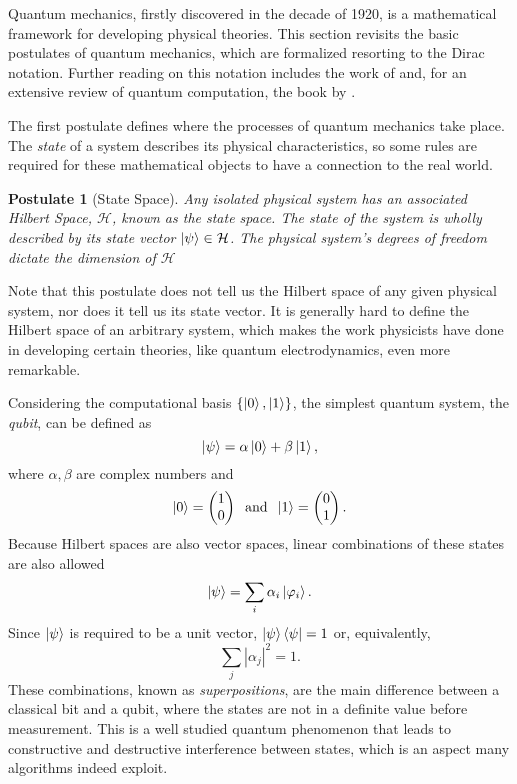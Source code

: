 \documentclass[../../../dissertation.tex]{subfiles}
\newtheorem{post}{Postulate}
\begin{document}
Quantum mechanics, firstly discovered in the decade of 1920, is a mathematical
framework for developing physical theories. This section revisits the basic postulates of quantum mechanics, which are formalized resorting to the
Dirac notation. Further reading on this notation includes the work of
\cite{sakurai1994} and, for an extensive review of quantum computation, the
book by \cite{nielsen2011}.\par  
The first postulate defines where the processes of quantum mechanics take
place. The \textit{state} of a system describes its physical characteristics,
so some rules are required for these mathematical objects to have a connection
to the real world.
\begin{post}[State Space] 
	Any isolated physical system has an associated Hilbert Space,
	$\mathcal{H}$, known as the state space. The state of the system is
	wholly described by its state vector $\ket{\psi} \in \mathcal{H}$. The
	physical system's degrees of freedom dictate the dimension of
	$\mathcal{H}$\par
\end{post}
Note that this postulate does not tell us the Hilbert space of any given
physical system, nor does it tell us its state vector. It is generally hard to
define the Hilbert space of an arbitrary system, which makes the work physicists
have done in developing certain theories, like quantum electrodynamics, even more
remarkable.\par 
Considering the computational basis $\{\ket{0},\ket{1}\}$, the simplest quantum
system, the \textit{qubit}, can be defined as 
\begin{equation}
	\ket{\psi} = \alpha \ket{0} + \beta \ket{1},
\end{equation}
where $\alpha,\beta$ are complex numbers and
\begin{equation}
	\ket{0} = \begin{pmatrix} 1 \\0 \end{pmatrix}  \; \; \text{and}  \;  \;  \ket{1} = \begin{pmatrix} 0 \\1 \end{pmatrix}.
\end{equation}
Because Hilbert spaces are also vector spaces, linear combinations of these
states are also allowed 
\begin{equation}
	\ket{\psi} = \sum_i \alpha_i \ket{\varphi_i}.
\end{equation}
Since $\ket{\psi}$ is required to be a unit vector, $\ket{\psi}\bra{\psi}=1$ or, equivalently,
\begin{equation}
	\sum_j | \alpha_j |^2 = 1 .
\end{equation}
These combinations, known as \textit{superpositions}, are the main difference between a classical bit and a qubit, where the states are not in a definite
value before measurement. This is a well studied quantum phenomenon that leads
to constructive and destructive interference between states, which is an aspect many algorithms indeed exploit.\par
\end{document}
